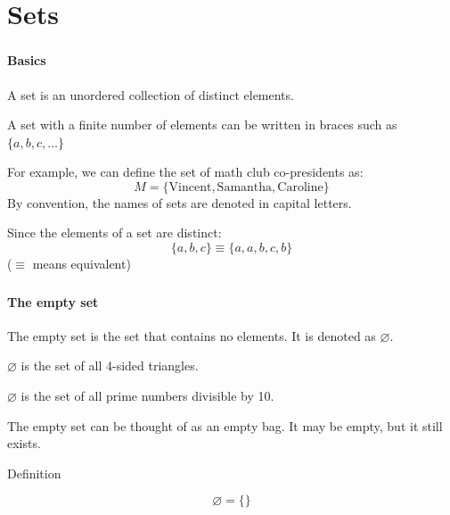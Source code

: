 \documentclass{beamer}
\newenvironment{compactmath}[1][\normalsize]%
	{\begin{minipage}{\textwidth}\vspace{-0.75\baselineskip}#1\begin{equation*}}
	{\end{equation*}\end{minipage}}
\begin{document}
	\section{Sets}
	\begin{frame}
		\frametitle{\secname}
		\framesubtitle{Basics}
		A set is an unordered collection of distinct elements.

		A set with a finite number of elements can be written in braces such as $\{a, b, c, \dots\}$

		For example, we can define the set of math club co-presidents as:
		\[M = \{\text{Vincent}, \text{Samantha}, \text{Caroline}\}\]
		By convention, the names of sets are denoted in capital letters.

		Since the elements of a set are distinct:
		\[\{a, b, c\} \equiv \{a, a, b, c, b\}\]
		($\equiv$ means equivalent)
	\end{frame}
	\begin{frame}
		\frametitle{\secname}
		\framesubtitle{The empty set}
		The empty set is the set that contains no elements. It is denoted as $\varnothing$.
		
		\begin{examples}
			$\varnothing$ is the set of all 4-sided triangles.

			$\varnothing$ is the set of all prime numbers divisible by 10.
		\end{examples}
		The empty set can be thought of as an empty bag. It may be empty, but it still exists.
		\begin{block}{Definition}
			\begin{compactmath}[\Huge]
				\varnothing = \{\}
			\end{compactmath}
		\end{block}
	\end{frame}
\end{document}
